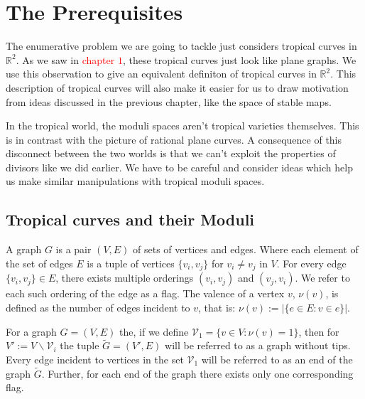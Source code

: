 \section{The Prerequisites}
The enumerative problem we are going to tackle just considers tropical curves in $\mathbb{R}^{2}$.
As we saw in \textcolor{red}{chapter $1$}, these tropical curves just look like plane graphs.
We use this observation to give an equivalent definiton of tropical curves in $\mathbb{R}^{2}$.
This description of tropical curves will also make it easier for us to draw motivation from ideas discussed in the previous chapter, like the space of stable maps.

\par In the tropical world, the moduli spaces aren't tropical varieties themselves. 
This is in contrast with the picture of rational plane curves.
A consequence of this disconnect between the two worlds is that we can't exploit the properties of divisors like we did earlier.
We have to be careful and consider ideas which help us make similar manipulations with tropical moduli spaces.

\subsection{Tropical curves and their Moduli}

\begin{definition}[Graphs]
    A graph $G$ is a pair $(V,E)$ of sets of vertices and edges.
    Where each element of the set of edges $E$ is a tuple of vertices $\{v_{i},v_{j}\}$ for $v_{i} \neq v_{j}$ in $V$. 
    For every edge $\{v_{i},v_{j}\} \in E$, there exists multiple orderings $(v_{i},v_{j})$ and $(v_{j},v_{i})$. We refer to each such ordering of the edge as a flag.
    The valence of a vertex $v$, $\nu(v)$, is defined as the number of edges incident to $v$, that is: $\nu(v):=|\{e \in E: v\in e\}|$.
\end{definition}

\begin{definition}
    For a graph $G = (V,E)$ the, if we define $\mathcal{V}_{1} = \{v \in V: \nu(v) =1  \}$, then for $V':= V\backslash \mathcal{V}_{i}$ the tuple $\tilde{G} = (V',E)$ will be referred to as a graph without tips. 
    Every edge incident to vertices in the set $\mathcal{V}_{1}$ will be referred to as an end of the graph $\tilde G$.
    Further, for each end of the graph there exists only one corresponding flag.
\end{definition}

